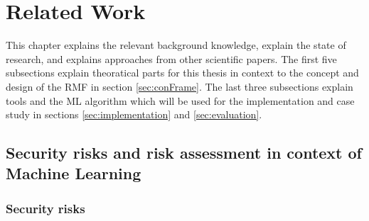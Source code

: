 
\section{Related Work}
\label{sec:relWork}

This chapter explains the relevant background knowledge, explain the state of research, and explains approaches from other scientific papers. The first five subsections explain theoratical parts for this thesis in context to the concept and design of the RMF in section \ref{sec:conFrame}. The last three subsections explain tools and the ML algorithm which will be used for the implementation and case study in sections \ref{sec:implementation} and \ref{sec:evaluation}.

\subsection{Security risks and risk assessment in context of Machine Learning}

\subsubsection*{Security risks}

